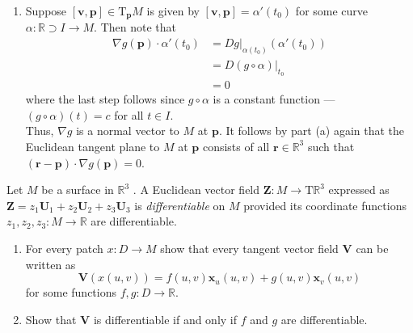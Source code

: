 \documentclass[12 pt, letterpaper]{hmcpset}
\begin{document}
\begin{solution}
\begin{enumerate}
			Thus, by our previous result, replacing every $[\mathbf{v}, \mathbf{p}] \in \mathrm{T}_{\mathbf{p}} M$ with $\mathbf{p} + \mathbf{v} \in \mathbb{R}^{3}$ gives us all $\mathbf{r} \in \mathbb{R}^{3}$ such that $(\mathbf{r} - \mathbf{p}) \cdot \mathbf{z} = 0$, which is equivalent to $[\mathbf{r} - \mathbf{p}, \mathbf{p}] \cdot [\mathbf{z}, \mathbf{p}] = 0$. That is, the Euclidean tangent plane at $x(u, v)$ consists of all $\mathbf{r} \in \mathbb{R}^{3}$ such that $[\mathbf{r} - x(u, v), x(u, v)] \cdot x_{u}(u, v) \cdot x_{v}(u, v) = 0$.
		\item
			Suppose $[\mathbf{v}, \mathbf{p}] \in \mathrm{T}_{\mathbf{p}} M$ is given by $[\mathbf{v}, \mathbf{p}] = \alpha'(t_{0})$ for some curve $\alpha : \mathbb{R} \supset I \to M$. Then note that \[
				\begin{split}
					\nabla g(\mathbf{p}) \cdot \alpha'(t_{0}) & = D g \Big |_{\alpha(t_{0})} (\alpha'(t_{0})) \\
										  & = D (g \circ \alpha) \Big |_{t_{0}} \\
										  & = 0
				\end{split}
			\]
			where the last step follows since $g \circ \alpha$ is a constant function --- $(g \circ \alpha)(t) = c$ for all $t \in I$. \\

			Thus, $\nabla g$ is a normal vector to $M$ at $\mathbf{p}$. It follows by part (a) again that the Euclidean tangent plane to $M$ at $\mathbf{p}$ consists of all $\mathbf{r} \in \mathbb{R}^{3}$ such that $(\mathbf{r} - \mathbf{p}) \cdot \nabla g(\mathbf{p}) = 0$.
			
		\end{enumerate}
\end{solution}

\pagebreak

\begin{problem}[Problem 3.]
	Let $M$  be a surface in $\mathbb{R}^{3}$ . A Euclidean vector field  $\mathbf{Z} : M \to \mathrm{T}\mathbb{R}^{3}$ expressed as $\mathbf{Z} = z_{1} \mathbf{U}_{1} + z_{2} \mathbf{U}_2 + z_{3} \mathbf{U}_{3}$ is \textit{differentiable} on $M$  provided its coordinate functions $z_{1}, z_{2}, z_{3} : M \to \mathbb{R}$  are differentiable.
	\begin{enumerate}
		\item For every patch $x : D \to M$ show that every tangent vector field $\mathbf{V}$ can be written as
			\[
				\mathbf{V}(x(u, v)) = f(u, v) \mathbf{x}_{u}(u, v) + g(u, v) \mathbf{x}_{v}(u, v)
			\]
			for some functions $f, g : D \to \mathbb{R}$.
		\item Show that $\mathbf{V}$ is differentiable if and only if $f$ and $g$ are differentiable.	
	\end{enumerate}
\end{problem}
\end{document}
